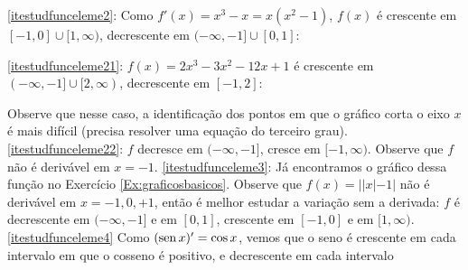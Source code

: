 \begin{Solution}{6.32}

\eqref{itestudfunceleme2}: Como $f'(x)=x^3-x=x(x^2-1)$,
$f(x)$ é crescente em $[-1,0]\cup [1,\infty)$,
decrescente em $(-\infty,-1]\cup[0,1]$:
\begin{center}
\begin{bmlimage}\end{bmlimage}
\end{center}
\eqref{itestudfunceleme21}: $f(x)=2x^3-3x^2-12x+1$ é
crescente em $(-\infty,-1]\cup[2,\infty)$, decrescente em $[-1,2]$:
\begin{center}
\begin{bmlimage}\end{bmlimage}
\end{center}
Observe que nesse caso, a identificação dos pontos em que o gráfico corta o
eixo $x$ é mais difícil (precisa resolver uma equação do terceiro grau).
\eqref{itestudfunceleme22}: $f$ decresce em $(-\infty,-1]$, cresce em
$[-1,\infty)$. Observe que $f$ não é derivável em $x=-1$.
\eqref{itestudfunceleme3}: Já encontramos o gráfico dessa função no Exercício
\ref{Ex:graficosbasicos}. Observe que
$f(x)=||x|-1|$ não é derivável em $x=-1,0,+1$, então é melhor estudar a variação
sem a derivada: $f$ é decrescente em $(-\infty,-1]$ e em $[0,1]$,
crescente em $[-1,0]$ e em $[1,\infty)$.
\eqref{itestudfunceleme4} Como $(\operatorname{sen} x)'=\cos x$, vemos que o seno é crescente
em cada intervalo em que o cosseno é positivo, e decrescente em cada intervalo

\end{Solution}
